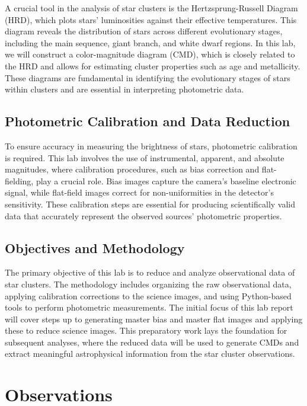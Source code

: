 \documentclass[linenumbers,twocolumn]{aastex631}
\begin{document}
A crucial tool in the analysis of star clusters is the Hertzsprung-Russell Diagram (HRD), which plots stars' luminosities against their effective temperatures. This diagram reveals the distribution of stars across different evolutionary stages, including the main sequence, giant branch, and white dwarf regions. In this lab, we will construct a color-magnitude diagram (CMD), which is closely related to the HRD and allows for estimating cluster properties such as age and metallicity. These diagrams are fundamental in identifying the evolutionary stages of stars within clusters and are essential in interpreting photometric data.

\subsection{Photometric Calibration and Data Reduction}

To ensure accuracy in measuring the brightness of stars, photometric calibration is required. This lab involves the use of instrumental, apparent, and absolute magnitudes, where calibration procedures, such as bias correction and flat-fielding, play a crucial role. Bias images capture the camera's baseline electronic signal, while flat-field images correct for non-uniformities in the detector's sensitivity. These calibration steps are essential for producing scientifically valid data that accurately represent the observed sources' photometric properties.

\subsection{Objectives and Methodology}

The primary objective of this lab is to reduce and analyze observational data of star clusters. The methodology includes organizing the raw observational data, applying calibration corrections to the science images, and using Python-based tools to perform photometric measurements. The initial focus of this lab report will cover steps up to generating master bias and master flat images and applying these to reduce science images. This preparatory work lays the foundation for subsequent analyses, where the reduced data will be used to generate CMDs and extract meaningful astrophysical information from the star cluster observations.

\section{Observations} \label{sec:observations}
\end{document}
